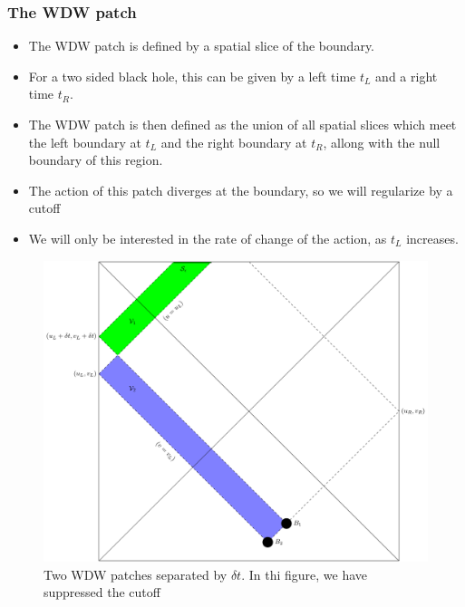 \documentclass[8pt,aspectratio=169]{beamer}
\begin{document}
\begin{frame}
\frametitle{The WDW patch}

\begin{minipage}[t]{0.5\linewidth}

\begin{itemize}

\item The WDW patch is defined by a spatial slice of the boundary. 

\item For a two sided black hole, this can be given by a left time $t_L$ and a right time $t_R$.

\item The WDW patch is then defined as the union of all spatial slices which meet the left boundary at $t_L$ and the right boundary at $t_R$, allong with the null boundary of this region.

\item The action of this patch diverges at the boundary, so we will regularize by a cutoff

\item We will only be interested in the rate of change of the action, as $t_L$ increases.

\end{itemize}

\end{minipage}\hfill
%
\begin{minipage}[t]{0.48\linewidth}

\begin{figure}
    \begin{center}
    
        \includegraphics[scale=0.35]{2WDW.pdf}    
    
    \end{center}
    \caption{Two WDW patches separated by $\delta t$.  In thi figure, we have suppressed the cutoff}
    \label{fig:2WDW}
\end{figure}

\end{minipage}

\end{frame}
\end{document}
